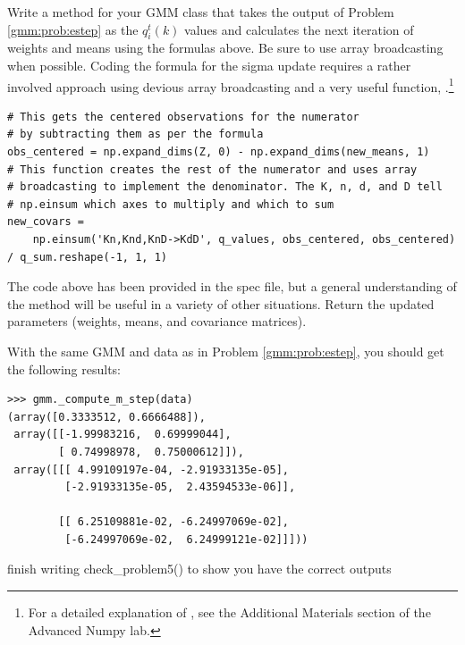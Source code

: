 \begin{problem}
\label{gmm:prob:mstep}
Write a method  for your GMM class that takes the output of Problem \ref{gmm:prob:estep} as the \(q_i^t(k)\) values and calculates the next iteration of weights and means using the formulas above. 
Be sure to use array broadcasting when possible. 
Coding the formula for the sigma update requires a rather involved approach using devious array broadcasting and a very useful function, .\footnote{For a detailed explanation of , see the Additional Materials section of the Advanced Numpy lab.}
\begin{lstlisting}
# This gets the centered observations for the numerator
# by subtracting them as per the formula
obs_centered = np.expand_dims(Z, 0) - np.expand_dims(new_means, 1)
# This function creates the rest of the numerator and uses array
# broadcasting to implement the denominator. The K, n, d, and D tell
# np.einsum which axes to multiply and which to sum
new_covars =
	np.einsum('Kn,Knd,KnD->KdD', q_values, obs_centered, obs_centered) / q_sum.reshape(-1, 1, 1)
\end{lstlisting}

The code above has been provided in the spec file, but a general understanding of the method will be useful in a variety of other situations.
Return the updated parameters (weights, means, and covariance matrices).

With the same GMM and data as in Problem \ref{gmm:prob:estep}, you should get the following results:
\begin{lstlisting}
>>> gmm._compute_m_step(data)
(array([0.3333512, 0.6666488]),
 array([[-1.99983216,  0.69999044],
        [ 0.74998978,  0.75000612]]),
 array([[[ 4.99109197e-04, -2.91933135e-05],
         [-2.91933135e-05,  2.43594533e-06]],

        [[ 6.25109881e-02, -6.24997069e-02],
         [-6.24997069e-02,  6.24999121e-02]]]))
\end{lstlisting}

finish writing check\_problem5() to show you have the correct outputs
\end{problem}

